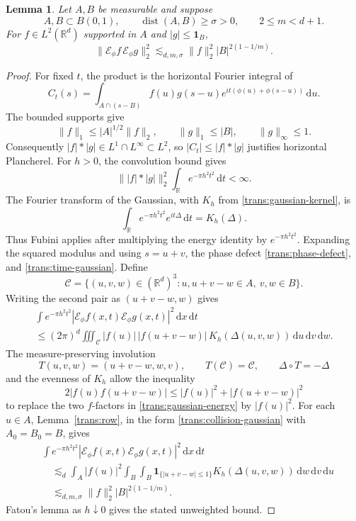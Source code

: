 \documentclass[11pt]{article}
\numberwithin{equation}{section}
\newtheorem{lemma}[theorem]{Lemma}
\newcommand{\R}{\mathbb{R}}
\newcommand{\dd}{\,\mathrm{d}}
\newcommand{\norm}[1]{\lVert #1\rVert}
\newcommand{\dist}{\operatorname{dist}}
\begin{document}
\begin{lemma}\label{trans:energy}
Let \(A,B\) be measurable and suppose
\[
 A,B\subset B(0,1),\qquad \dist(A,B)\geq\sigma>0,\qquad
 2\leq m<d+1.
\]
For \(f\in L^2(\R^d)\) supported in \(A\) and
\(|g|\leq\mathbf1_B\),
\[
 \norm{\mathcal E_\phi f\,\mathcal E_\phi g}_2^2
 \lesssim_{d,m,\sigma}\norm f_2^2|B|^{2(1-1/m)}.
\]
\end{lemma}

\begin{proof}
For fixed \(t\), the product is the horizontal Fourier integral
of
\[
 C_t(s)=\int_{A\cap(s-B)} f(u)g(s-u)
       e^{it(\phi(u)+\phi(s-u))}\dd u.
\]
The bounded supports give
\[
 \norm f_1\leq |A|^{1/2}\norm f_2,\qquad
 \norm g_1\leq |B|,\qquad \norm g_\infty\leq1.
\]
Consequently \(|f|*|g|\in L^1\cap L^\infty\subset L^2\), so
\(|C_t|\leq |f|*|g|\) justifies horizontal Plancherel.
For \(h>0\), the convolution bound gives
\[
 \norm{|f|*|g|}_2^2\int_\R e^{-\pi h^2t^2}\dd t<\infty.
\]
The Fourier transform of the Gaussian, with \(K_h\) from
\eqref{trans:gaussian-kernel}, is
\begin{equation}\label{trans:time-gaussian}
 \int_\R e^{-\pi h^2t^2}e^{it\Delta}\dd t=K_h(\Delta).
\end{equation}
Thus Fubini applies after multiplying the energy identity by
\(e^{-\pi h^2t^2}\). Expanding the squared modulus and using
\(s=u+v\), the phase defect \eqref{trans:phase-defect}, and
\eqref{trans:time-gaussian}. Define
\[
 \mathcal C=\{(u,v,w)\in(\R^d)^3:u,u+v-w\in A,\ v,w\in B\}.
\]
Writing the second pair as \((u+v-w,w)\) gives
\begin{multline} \label{trans:gaussian-energy}
 \int e^{-\pi h^2t^2}|\mathcal E_\phi f(x,t)\mathcal E_\phi g(x,t)|^2\dd x\dd t\\
 \leq (2\pi)^d
   \iiint_{\mathcal C}|f(u)|\,|f(u+v-w)|\,
                   K_h(\Delta(u,v,w))\dd u\dd v\dd w.
\end{multline}
The measure-preserving involution
\[
 T(u,v,w)=(u+v-w,w,v),\qquad
 T(\mathcal C)=\mathcal C,\qquad
 \Delta\circ T=-\Delta
\]
and the evenness of \(K_h\) allow the inequality
\[
 2|f(u)f(u+v-w)|\leq |f(u)|^2+|f(u+v-w)|^2
\]
to replace the two \(f\)-factors in \eqref{trans:gaussian-energy}
by \(|f(u)|^2\). For each \(u\in A\), Lemma~\ref{trans:row},
in the form \eqref{trans:collision-gaussian} with \(A_0=B_0=B\), gives
\begin{align*}
 &\int e^{-\pi h^2t^2}
       |\mathcal E_\phi f(x,t)\mathcal E_\phi g(x,t)|^2\dd x\dd t\\
 &\quad\lesssim_d\int_A |f(u)|^2
       \int_B\int_B\mathbf1_{\{|u+v-w|\leq1\}}
                     K_h(\Delta(u,v,w))\dd w\dd v\dd u\\
 &\quad\lesssim_{d,m,\sigma}\norm f_2^2|B|^{2(1-1/m)}.
\end{align*}
Fatou's lemma as \(h\downarrow0\) gives the stated unweighted bound.
\end{proof}
\end{document}
